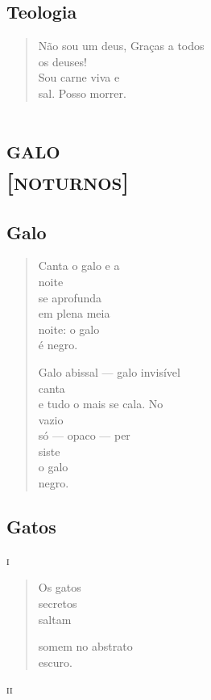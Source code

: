 \chapter{Teologia}

\begin{verse}
Não sou um deus, Graças a todos\\
os deuses!\\
Sou carne viva e\\
sal. Posso morrer.
\end{verse}

\part*{\textsc{galo}\\ {[}\textsc{noturnos}{]}}

\chapter{Galo}

\begin{verse}
Canta o galo e a\\
noite\\
se aprofunda\\
em plena meia\\
noite: o galo\\
é negro.

Galo abissal --- galo invisível\\
canta\\
e tudo o mais se cala. No\\
vazio\\
só --- opaco --- per\\
siste\\
o galo\\
negro.
\end{verse}

\chapter{Gatos}

\forceindent\textsc{i}

\begin{verse}
Os gatos\\
secretos\\
saltam

somem no abstrato\\
escuro.
\end{verse}

\medskip
\textsc{ii}

